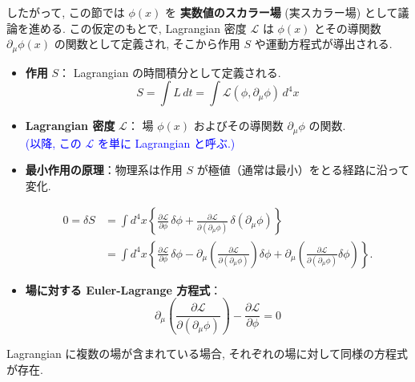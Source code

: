 \documentclass[a4paper,12pt]{article}
\begin{document}
したがって, この節では $\phi(x)$ を \textbf{実数値のスカラー場} (実スカラー場) として議論を進める. この仮定のもとで, Lagrangian 密度 $\mathcal{L}$ は $\phi(x)$ とその導関数 $\partial_\mu \phi(x)$ の関数として定義され, そこから作用 $S$ や運動方程式が導出される.

\color{black}

\begin{itemize}
    \item \textbf{作用} $S$： Lagrangian の時間積分として定義される.
    \begin{equation*}
        S = \int L\,dt = \int \mathcal{L}(\phi, \partial_\mu \phi)\,d^4x \tag{2.1}
    \end{equation*}

    \item \textbf{Lagrangian 密度} $\mathcal{L}$： 場 $\phi(x)$ およびその導関数 $\partial_\mu \phi$ の関数.\\
    \hspace{4cm} \textcolor{blue}{ (以降, この $\mathcal{L}$ を単に Lagrangian と呼ぶ.) }

    \item \textbf{最小作用の原理}：物理系は作用 $S$ が極値（通常は最小）をとる経路に沿って変化.
    
    \begin{align*}
        0 = \delta S 
        &= \int d^4x \left\{ \frac{\partial \mathcal{L}}{\partial \phi} \, \delta \phi 
        + \frac{\partial \mathcal{L}}{\partial (\partial_\mu \phi)} \, \delta(\partial_\mu \phi) \right\} \\
        &= \int d^4x \left\{ \frac{\partial \mathcal{L}}{\partial \phi} \, \delta \phi 
        - \partial_\mu \left( \frac{\partial \mathcal{L}}{\partial (\partial_\mu \phi)} \right) \delta \phi 
        + \partial_\mu \left( \frac{\partial \mathcal{L}}{\partial (\partial_\mu \phi)} \delta \phi \right) \right\}. \tag{2.2}
    \end{align*}
        

    \item \textbf{場に対する Euler-Lagrange 方程式}：
    \begin{equation}\label{2.3}
        \partial_\mu \left( \frac{\partial \mathcal{L}}{\partial (\partial_\mu \phi)} \right) - \frac{\partial \mathcal{L}}{\partial \phi} = 0 \tag{2.3}
    \end{equation}
\end{itemize}

\noindent Lagrangian に複数の場が含まれている場合, それぞれの場に対して同様の方程式が存在.
\end{document}
